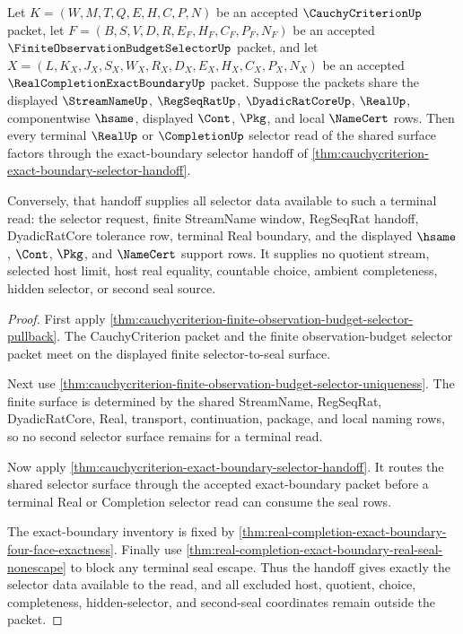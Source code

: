 \begin{theorem}
\label{thm:cauchy-criterion-streamname-real-budget-selector-terminal-boundary}
Let $K=(W,M,T,Q,E,H,C,P,N)$ be an accepted $\CauchyCriterionUp$ packet, let
$F=(B,S,V,D,R,E_F,H_F,C_F,P_F,N_F)$ be an accepted
$\FiniteObservationBudgetSelectorUp$ packet, and let
$X=(L,K_X,J_X,S_X,W_X,R_X,D_X,E_X,H_X,C_X,P_X,N_X)$ be an accepted
$\RealCompletionExactBoundaryUp$ packet. Suppose the packets share the
displayed $\StreamNameUp$, $\RegSeqRatUp$, $\DyadicRatCoreUp$, $\RealUp$,
componentwise $\hsame$, displayed $\Cont$, $\Pkg$, and local $\NameCert$ rows.
Then every terminal $\RealUp$ or $\CompletionUp$ selector read of the shared
surface factors through the exact-boundary selector handoff of
\autoref{thm:cauchycriterion-exact-boundary-selector-handoff}.

Conversely, that handoff supplies all selector data available to such a
terminal read: the selector request, finite StreamName window, RegSeqRat
handoff, DyadicRatCore tolerance row, terminal Real boundary, and the displayed
$\hsame$, $\Cont$, $\Pkg$, and $\NameCert$ support rows. It supplies no quotient
stream, selected host limit, host real equality, countable choice, ambient
completeness, hidden selector, or second seal source.
\end{theorem}
\begin{proof}
First apply
\autoref{thm:cauchycriterion-finite-observation-budget-selector-pullback}. The
CauchyCriterion packet and the finite observation-budget selector packet meet
on the displayed finite selector-to-seal surface.

Next use
\autoref{thm:cauchycriterion-finite-observation-budget-selector-uniqueness}.
The finite surface is determined by the shared StreamName, RegSeqRat,
DyadicRatCore, Real, transport, continuation, package, and local naming rows,
so no second selector surface remains for a terminal read.

Now apply \autoref{thm:cauchycriterion-exact-boundary-selector-handoff}. It
routes the shared selector surface through the accepted exact-boundary packet
before a terminal Real or Completion selector read can consume the seal rows.

The exact-boundary inventory is fixed by
\autoref{thm:real-completion-exact-boundary-four-face-exactness}. Finally use
\autoref{thm:real-completion-exact-boundary-real-seal-nonescape} to block any
terminal seal escape. Thus the handoff gives exactly the selector data
available to the read, and all excluded host, quotient, choice, completeness,
hidden-selector, and second-seal coordinates remain outside the packet.
\end{proof}

